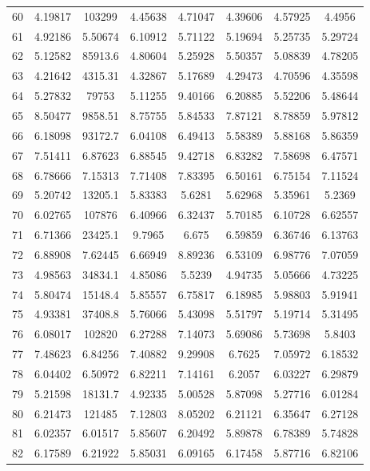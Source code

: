 \begin{center}
\begin{longtable}{cccccccc}
60 & 4.19817 & 103299 & 4.45638 & 4.71047 & 4.39606 & 4.57925 & 4.4956\\
61 & 4.92186 & 5.50674 & 6.10912 & 5.71122 & 5.19694 & 5.25735 & 5.29724\\
62 & 5.12582 & 85913.6 & 4.80604 & 5.25928 & 5.50357 & 5.08839 & 4.78205\\
63 & 4.21642 & 4315.31 & 4.32867 & 5.17689 & 4.29473 & 4.70596 & 4.35598\\
64 & 5.27832 & 79753 & 5.11255 & 9.40166 & 6.20885 & 5.52206 & 5.48644\\
65 & 8.50477 & 9858.51 & 8.75755 & 5.84533 & 7.87121 & 8.78859 & 5.97812\\
66 & 6.18098 & 93172.7 & 6.04108 & 6.49413 & 5.58389 & 5.88168 & 5.86359\\
67 & 7.51411 & 6.87623 & 6.88545 & 9.42718 & 6.83282 & 7.58698 & 6.47571\\
68 & 6.78666 & 7.15313 & 7.71408 & 7.83395 & 6.50161 & 6.75154 & 7.11524\\
69 & 5.20742 & 13205.1 & 5.83383 & 5.6281 & 5.62968 & 5.35961 & 5.2369\\
70 & 6.02765 & 107876 & 6.40966 & 6.32437 & 5.70185 & 6.10728 & 6.62557\\
71 & 6.71366 & 23425.1 & 9.7965 & 6.675 & 6.59859 & 6.36746 & 6.13763\\
72 & 6.88908 & 7.62445 & 6.66949 & 8.89236 & 6.53109 & 6.98776 & 7.07059\\
73 & 4.98563 & 34834.1 & 4.85086 & 5.5239 & 4.94735 & 5.05666 & 4.73225\\
74 & 5.80474 & 15148.4 & 5.85557 & 6.75817 & 6.18985 & 5.98803 & 5.91941\\
75 & 4.93381 & 37408.8 & 5.76066 & 5.43098 & 5.51797 & 5.19714 & 5.31495\\
76 & 6.08017 & 102820 & 6.27288 & 7.14073 & 5.69086 & 5.73698 & 5.8403\\
77 & 7.48623 & 6.84256 & 7.40882 & 9.29908 & 6.7625 & 7.05972 & 6.18532\\
78 & 6.04402 & 6.50972 & 6.82211 & 7.14161 & 6.2057 & 6.03227 & 6.29879\\
79 & 5.21598 & 18131.7 & 4.92335 & 5.00528 & 5.87098 & 5.27716 & 6.01284\\
80 & 6.21473 & 121485 & 7.12803 & 8.05202 & 6.21121 & 6.35647 & 6.27128\\
81 & 6.02357 & 6.01517 & 5.85607 & 6.20492 & 5.89878 & 6.78389 & 5.74828\\
82 & 6.17589 & 6.21922 & 5.85031 & 6.09165 & 6.17458 & 5.87716 & 6.82106\\

\end{longtable}
\end{center}
